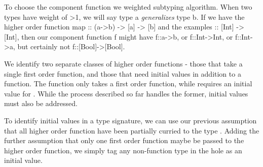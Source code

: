 To choose the component function we weighted subtyping algorithm.
When two types have weight of >1, we will say type a \textit{generalizes} type b.
If we have the higher order function map :: (a->b) -> [a] -> [b] and the examples :: [Int] -> [Int], then our component function f might have f::a->b, or f::Int->Int, or f::Int->a, but certainly not f::[Bool]->[Bool].

We identify two separate classes of higher order functions - those that take a single first order function, and those that need initial values in addition to a function. The  function only takes a first order function, while  requires an initial value for . While the process described so far handles the former, initial values must also be addressed.

To identify initial values in a type signature, we can use our previous assumption that all higher order function have been partially curried to the type \codeinline{_ -> *-> *}. Adding the further assumption that only one first order function maybe be passed to the higher order function, we simply tag any non-function type in the hole as an initial value.


